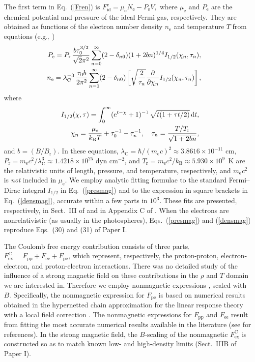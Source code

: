 \documentclass{emulateapj}
\newcommand{\bea}{\begin{eqnarray}}
\newcommand{\eea}{\end{eqnarray}}
\newcommand{\req}[1]{Eq.\ (\ref{#1})}
\newcommand{\mel}{m_\mathrm{e}}
\newcommand{\kB}{k_\mathrm{B}}
\begin{document}
The first term in \req{Fren} is
 $
   F_\mathrm{id}^\mathrm{e}  = 
     \mu_\mathrm{e} N_\mathrm{e} - P_\mathrm{e} V,
$
where $\mu_\mathrm{e}$ and $P_\mathrm{e}$ are
the chemical potential and pressure of the ideal Fermi gas,
respectively. 
They are obtained as functions of 
the electron number density
$n_\mathrm{e}$ and temperature $T$
from equations
(e.g., \citealp{bh82})
\bea&&\hspace*{-2em}
       P_\mathrm{e} =
   P_\mathrm{r}\,{b \tau_0^{3/2}\over\sqrt2\pi^2}
   \sum_{n=0}^\infty (2-\delta_{n0})
           (1+2bn)^{1/4} I_{1/2}(\chi_n,\tau_n),
\label{presmag}
\\&&\hspace*{-2em}
   n_\mathrm{e} =  \lambda_\mathrm{C}^{-3} \,{\tau_0 b \over 2\pi^2} 
  \sum_{n=0}^\infty (2-\delta_{n0})  
 \left[ \sqrt{2\over\tau_n} 
     {\partial\over \partial\chi_n} I_{1/2}(\chi_n,\tau_n)
  \right],
\label{densmag}
\eea
where 
\bea
&&\!\!
   I_{1/2}(\chi,\tau) = 
   \int_0^\infty (\mathrm{e}^{t-\chi}+1)^{-1}\,
   \sqrt{t(1+\tau t/2)}\,\mathrm{d}t, 
\nonumber
\\&&\!\!
   \chi_n = \frac{\mu_\mathrm{e}}{\kB T}
   +\tau_0^{-1}-\tau_n^{-1},
\quad
   \tau_n = {T/T_\mathrm{r}\over\sqrt{1+2bn}},
  \nonumber
\eea
and $b= (B/B_\mathrm{r})$. 
In these equations,
$\lambda_\mathrm{C}=\hbar/(\mel c)^2\approx
3.8616\times10^{-11}$ cm,
$P_\mathrm{r}=\mel c^2/\lambda_\mathrm{C}^3
\approx 1.4218\times10^{25}$ dyn cm$^{-2}$, and
$T_\mathrm{r}=\mel c^2/k_\mathrm{B}\approx5.930
\times10^9$~K
are the relativistic units of length, pressure, and temperature,
respectively, and $\mel c^2$ is \emph{not} included in 
$\mu_\mathrm{e}$.
We employ analytic fitting formulae to
the standard Fermi--Dirac integral
$I_{1/2}$ in \req{presmag}
and to the expression in square brackets in \req{densmag},
accurate within a few parts in $10^3$. These fits are
presented, respectively, 
in Sect.\ III of \citet{CP98}
and in Appendix C of \citet{P96a}.
When the electrons are nonrelativistic (as usually
 in the photospheres), Eqs.\ (\ref{presmag}) and
(\ref{densmag}) reproduce Eqs.\ (30) and (31) of Paper I.

The Coulomb free energy contribution consists of three parts, 
$F_\mathrm{ex}^\mathrm{C}=F_\mathrm{pp}+F_\mathrm{ee}+F_\mathrm{pe}$,
which represent, respectively, the proton-proton, electron-electron,
and proton-electron interactions. There was no detailed 
study of the influence of a strong magnetic field on these 
contributions in the $\rho$ and $T$ domain we are interested in.
Therefore we employ nonmagnetic expressions
\citep{CP98,PC00}, 
scaled with $B$. Specifically, the nonmagnetic expression
for $F_\mathrm{pe}$ is based on 
numerical results obtained in the 
hypernetted chain approximation for the linear
response theory with a local field correction 
\citep{C90}. The nonmagnetic expressions 
for $F_\mathrm{pp}$ and $F_\mathrm{ee}$
result from fitting the most accurate numerical 
results available in the literature 
 (see \citealp{PC00} for references).
In the strong magnetic field, the $B$-scaling of
the nonmagnetic $F_\mathrm{ex}^\mathrm{C}$ is 
constructed so as to match known low- and high-density limits
(Sect.\ IIIB of Paper I).
\end{document}
